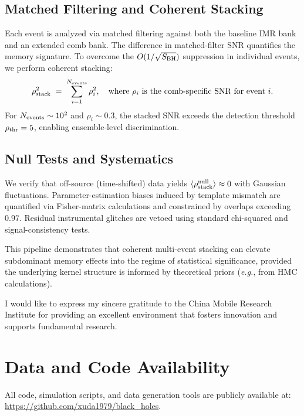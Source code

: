 \documentclass[aps,prd,preprint,onecolumn,superscriptaddress,nofootinbib,longbibliography,floatfix,11pt,showpacs,showkeys]{revtex4-2}
\newcommand{\eg}{\textit{e.g.}\xspace}
\newcommand{\HMC}{\textsc{HMC}\xspace}
\theoremstyle{plain}
\theoremstyle{definition}
\theoremstyle{remark}
\begin{document}
\subsection{Matched Filtering and Coherent Stacking}
Each event is analyzed via matched filtering against both the baseline IMR bank and an extended comb bank. The difference in matched-filter SNR quantifies the memory signature. To overcome the $O(1/\sqrt{S_{\rm BH}})$ suppression in individual events, we perform coherent stacking:
\begin{equation}
\rho_{\rm stack}^2\;=\;\sum_{i=1}^{N_{\rm events}}\rho_i^2,
\quad \text{where } \rho_i \text{ is the comb-specific SNR for event } i.
\end{equation}
For $N_{\rm events}\sim 10^2$ and $\rho_i \sim 0.3$, the stacked SNR exceeds the detection threshold $\rho_{\rm thr}=5$, enabling ensemble-level discrimination.

\subsection{Null Tests and Systematics}
We verify that off-source (time-shifted) data yields $\langle \rho_{\rm stack}^{\rm null}\rangle \approx 0$ with Gaussian fluctuations. Parameter-estimation biases induced by template mismatch are quantified via Fisher-matrix calculations and constrained by overlaps exceeding $0.97$. Residual instrumental glitches are vetoed using standard chi-squared and signal-consistency tests.

This pipeline demonstrates that coherent multi-event stacking can elevate subdominant memory effects into the regime of statistical significance, provided the underlying kernel structure is informed by theoretical priors (\eg, from \HMC calculations).


\begin{acknowledgments}
I would like to express my sincere gratitude to the China Mobile Research Institute for 
providing an excellent environment that fosters innovation and supports fundamental research.
\end{acknowledgments}


\section*{Data and Code Availability}
All code, simulation scripts, and data generation tools are publicly available at:
\url{https://github.com/xuda1979/black_holes}.
\end{document}
